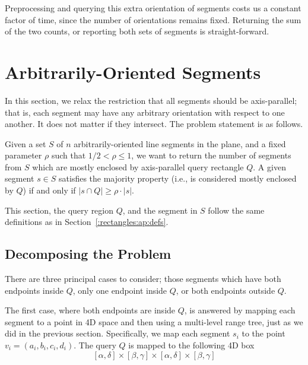 Preprocessing and querying this extra orientation of segments costs us a constant factor of time, since the number of orientations remains fixed.  Returning the sum of the two counts, or reporting both sets of segments is straight-forward.



\section{Arbitrarily-Oriented Segments}
\label{:rectangles:ao}

In this section, we relax the restriction that all segments should be axis-parallel; that is, each segment may have any arbitrary orientation with respect to one another.  It does not matter if they intersect. The problem statement is as follows.

\begin{problem}
Given a set $S$ of $n$ arbitrarily-oriented line segments in the plane, and a fixed parameter $\rho$ such that $1/2 < \rho \leq 1$, we want to return the number of segments from $S$ which are mostly enclosed by axis-parallel query rectangle $Q$. A given segment $s \in S$ satisfies the majority property (i.e., is considered mostly enclosed by $Q$) if and only if $|s \cap Q| \geq \rho \cdot |s|$.
\end{problem}

This section, the query region $Q$, and the segment in $S$ follow the same definitions as in Section~\ref{:rectangles:ap:defs}.

\subsection{Decomposing the Problem}
\label{:rectangles:ao:approach}

There are three principal cases to consider; those segments which have both endpoints inside $Q$, only one endpoint inside $Q$, or both endpoints outside $Q$.  

The first case, where both endpoints are inside $Q$, is answered by mapping each segment to a point in 4D space and then using a multi-level range tree, just as we did in the previous section.  Specifically, we map each segment $s_i$ to the point $v_i = (a_i, b_i, c_i, d_i)$. The query $Q$ is mapped to the following 4D box
\[
[\alpha, \delta] \times [\beta, \gamma] \times [\alpha, \delta] \times [\beta, \gamma]
\]

